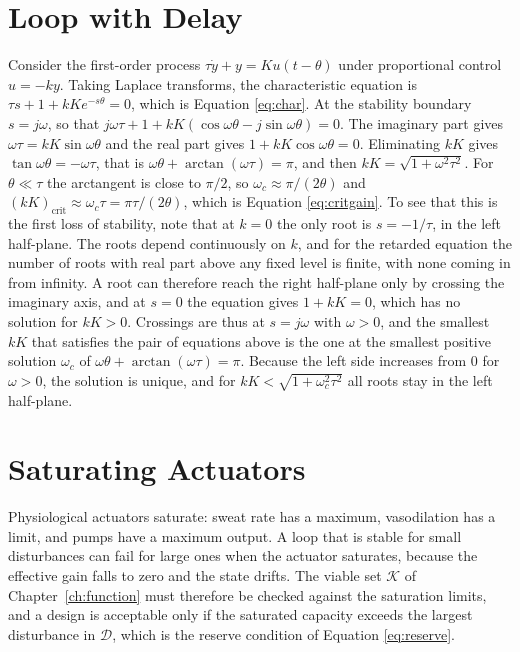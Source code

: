 \documentclass[11pt,openany]{book}
\theoremstyle{definition}
\theoremstyle{remark}
\newcommand{\Kset}{\mathcal{K}}
\newcommand{\Dset}{\mathcal{D}}
\begin{document}
\section{Loop with Delay}

Consider the first-order process $\tau\dot y+y=Ku(t-\theta)$ under proportional control $u=-ky$. Taking Laplace transforms, the characteristic equation is $\tau s+1+kKe^{-s\theta}=0$, which is Equation \eqref{eq:char}. At the stability boundary $s=j\omega$, so that $j\omega\tau+1+kK(\cos\omega\theta-j\sin\omega\theta)=0$. The imaginary part gives $\omega\tau=kK\sin\omega\theta$ and the real part gives $1+kK\cos\omega\theta=0$. Eliminating $kK$ gives $\tan\omega\theta=-\omega\tau$, that is $\omega\theta+\arctan(\omega\tau)=\pi$, and then $kK=\sqrt{1+\omega^{2}\tau^{2}}$. For $\theta\ll\tau$ the arctangent is close to $\pi/2$, so $\omega_c\approx\pi/(2\theta)$ and $(kK)_{\mathrm{crit}}\approx\omega_c\tau=\pi\tau/(2\theta)$, which is Equation \eqref{eq:critgain}. To see that this is the first loss of stability, note that at $k=0$ the only root is $s=-1/\tau$, in the left half-plane. The roots depend continuously on $k$, and for the retarded equation the number of roots with real part above any fixed level is finite, with none coming in from infinity. A root can therefore reach the right half-plane only by crossing the imaginary axis, and at $s=0$ the equation gives $1+kK=0$, which has no solution for $kK>0$. Crossings are thus at $s=j\omega$ with $\omega>0$, and the smallest $kK$ that satisfies the pair of equations above is the one at the smallest positive solution $\omega_c$ of $\omega\theta+\arctan(\omega\tau)=\pi$. Because the left side increases from $0$ for $\omega>0$, the solution is unique, and for $kK<\sqrt{1+\omega_c^{2}\tau^{2}}$ all roots stay in the left half-plane.

\section{Saturating Actuators}

Physiological actuators saturate: sweat rate has a maximum, vasodilation has a limit, and pumps have a maximum output. A loop that is stable for small disturbances can fail for large ones when the actuator saturates, because the effective gain falls to zero and the state drifts. The viable set $\Kset$ of Chapter~\ref{ch:function} must therefore be checked against the saturation limits, and a design is acceptable only if the saturated capacity exceeds the largest disturbance in $\Dset$, which is the reserve condition of Equation \eqref{eq:reserve}.
\end{document}
